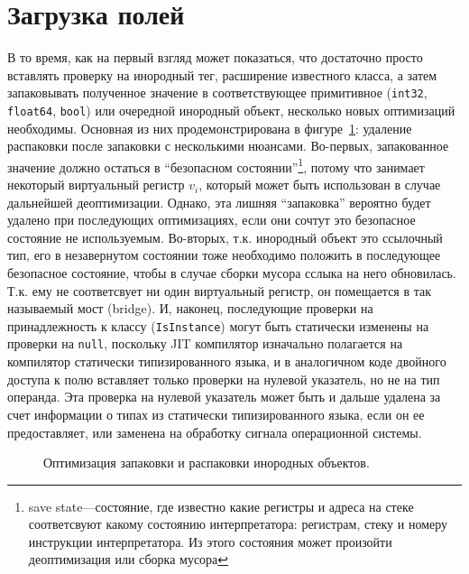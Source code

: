 \documentclass[times,specification,annotation]{itmo-student-thesis}
\begin{document}
\section{Загрузка полей}
В то время, как на первый взгляд может показаться, что достаточно просто вставлять проверку на инородный тег, расширение известного класса, а затем запаковывать полученное значение в соответствующее примитивное (\texttt{int32}, \texttt{float64}, \texttt{bool}) или очередной инородный объект, несколько новых оптимизаций необходимы. Основная из них продемонстрирована в фигуре~\ref{fig:field-opt}: удаление распаковки после запаковки с несколькими нюансами. Во-первых, запакованное значение должно остаться в ``безопасном состоянии''\footnote{save state---состояние, где известно какие регистры и адреса на стеке соответсвуют какому состоянию интерпретатора: регистрам, стеку и номеру инструкции интерпретатора. Из этого состояния может произойти деоптимизация или сборка мусора}, потому что занимает некоторый виртуальный регистр $v_i$, который может быть использован в случае дальнейшей деоптимизации. Однако, эта лишняя ``запаковка'' вероятно будет удалено при последующих оптимизациях, если они сочтут это безопасное состояние не используемым. Во-вторых, т.к. инородный объект это ссылочный тип, его в незавернутом состоянии тоже необходимо положить в последующее безопасное состояние, чтобы в случае сборки мусора сслыка на него обновилась. Т.к. ему не соответсвует ни один виртуальный регистр, он помещается в так называемый мост (bridge). И, наконец, последующие проверки на принадлежность к классу (\texttt{IsInstance}) могут быть статически изменены на проверки на \texttt{null}, поскольку JIT компилятор изначально полагается на компилятор статически типизированного языка, и в аналогичном коде двойного доступа к полю вставляет только проверки на нулевой указатель, но не на тип операнда. Эта проверка на нулевой указатель может быть и дальше удалена за счет информации о типах из статически типизированного языка, если он ее предоставляет, или заменена на обработку сигнала операционной системы.

\begin{figure}[H]
	\caption{Оптимизация запаковки и распаковки инородных объектов.}\label{fig:field-opt}
	\centering
	\end{figure}
\end{document}
